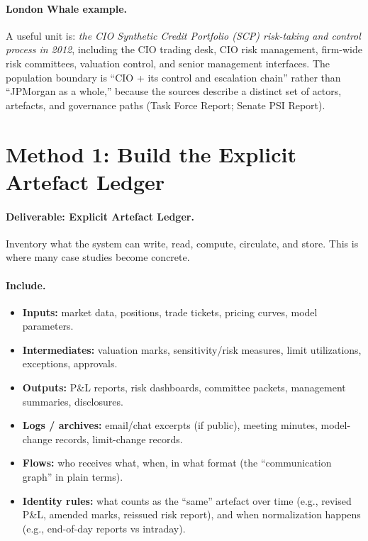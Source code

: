 \paragraph{London Whale example.}
A useful unit is: \emph{the CIO Synthetic Credit Portfolio (SCP) risk-taking and control process in 2012},
including the CIO trading desk, CIO risk management, firm-wide risk committees, valuation control, and senior management
interfaces. The population boundary is “CIO + its control and escalation chain” rather than “JPMorgan as a whole,”
because the sources describe a distinct set of actors, artefacts, and governance paths (Task Force Report; Senate PSI Report).

\section{Method 1: Build the Explicit Artefact Ledger}
\label{sec:m1-ledger}

\paragraph{Deliverable: Explicit Artefact Ledger.}
Inventory what the system can write, read, compute, circulate, and store. This is where many case studies become concrete.

\paragraph{Include.}
\begin{itemize}
  \item \textbf{Inputs:} market data, positions, trade tickets, pricing curves, model parameters.
  \item \textbf{Intermediates:} valuation marks, sensitivity/risk measures, limit utilizations, exceptions, approvals.
  \item \textbf{Outputs:} P\&L reports, risk dashboards, committee packets, management summaries, disclosures.
  \item \textbf{Logs / archives:} email/chat excerpts (if public), meeting minutes, model-change records, limit-change records.
  \item \textbf{Flows:} who receives what, when, in what format (the “communication graph” in plain terms).
  \item \textbf{Identity rules:} what counts as the “same” artefact over time (e.g., revised P\&L, amended marks, reissued risk report),
        and when normalization happens (e.g., end-of-day reports vs intraday).
\end{itemize}

